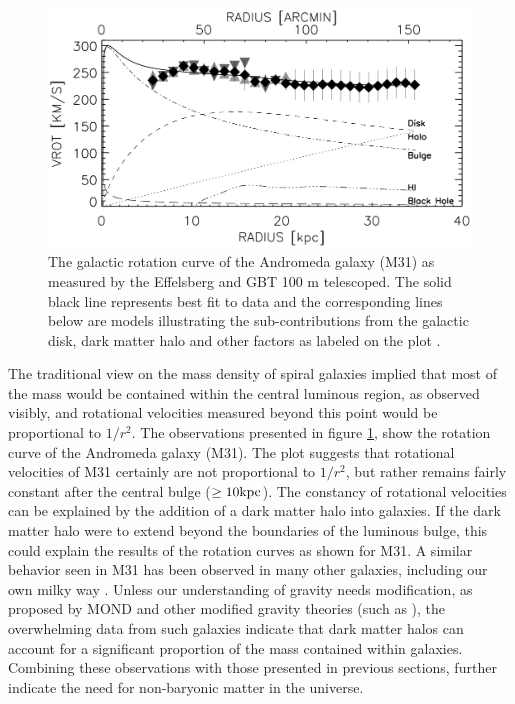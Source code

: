 \begin{figure}[ht!]
    \begin{center}
        \includegraphics[scale=0.35]{Chapter_1/Figures/Rotation_curve_M31.jpg}
        \caption[Observed rotation curve and corresponding mass models for the Andromeda galaxy (M31) by using data from the Effelsberg and GBT 100 m observations.]%
        {The galactic rotation curve of the Andromeda galaxy (M31) as measured by the Effelsberg and GBT 100 m telescoped. The solid black line represents best fit to data and the corresponding lines below are models illustrating the sub-contributions from the galactic disk, dark matter halo and other factors as labeled on the plot \cite{Carignan_2006}.}
        \label{fig:rotation_m31}
        \end{center}
\end{figure}

The traditional view on the mass density of spiral galaxies implied that most of the mass would be contained within the central luminous region, as observed visibly, and rotational velocities measured beyond this point would be proportional to $1/r^2$. The observations presented in figure \ref{fig:rotation_m31}, show the rotation curve of the Andromeda galaxy (M31). The plot suggests that rotational velocities of M31 certainly are not proportional to $1/r^2$, but rather remains fairly constant after the central bulge ($\geq 10 \text{kpc}$). The constancy of rotational velocities can be explained by the addition of a dark matter halo into galaxies. If the dark matter halo were to extend beyond the boundaries of the luminous bulge, this could explain the results of the rotation curves as shown for M31. A similar behavior seen in M31 has been observed in many other galaxies, including our own milky way \cite{Carignan_2006, Mr_z_2019}. Unless our understanding of gravity needs modification, as proposed by MOND and other modified gravity theories (such as \cite{Milgrom_2015, Moffat_2006}), the overwhelming data from such galaxies indicate that dark matter halos can account for a significant proportion of the mass contained within galaxies. Combining these observations with those presented in previous sections, further indicate the need for non-baryonic matter in the universe.


